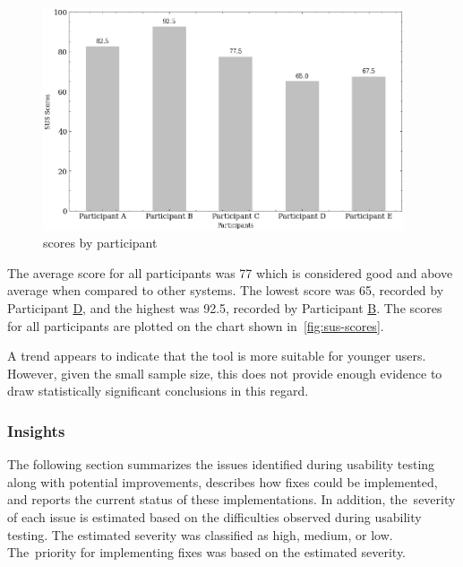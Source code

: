 \begin{figure}[h!]
\centering
\includegraphics[width=0.95\textwidth]{images/graph_sus.png}
\caption{ scores by participant}
\label{fig:sus-scores}
\end{figure}


The average  score for all participants was 77 which is considered good and above average when compared to other systems. The lowest  score was 65, recorded by Participant \hyperref[itm:D]{D}, and the highest was 92.5, recorded by Participant \hyperref[itm:B]{B}. The scores for all participants are plotted on the chart shown in~\autoref{fig:sus-scores}.

A trend appears to indicate that the tool is more suitable for younger users. However, given the small sample size, this does not provide enough evidence to draw statistically significant conclusions in this regard.


\subsubsection{Insights} \label{section:insights}

The following section summarizes the issues identified during usability testing along with potential improvements, describes how fixes could be implemented, and reports the current status of these implementations. In addition, the~severity of each issue is estimated based on the difficulties observed during usability testing. The estimated severity was classified as high, medium, or low. The~priority for implementing fixes was based on the estimated severity.

